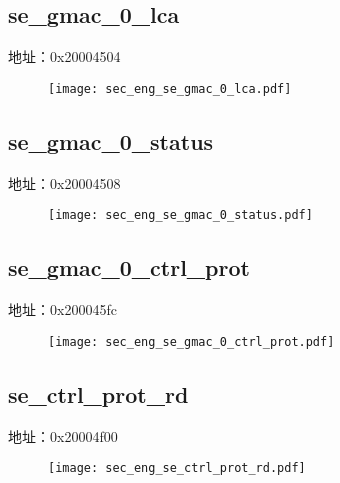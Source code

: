 \subsection{se\_gmac\_0\_lca}
\label{sec_eng-se-gmac-0-lca}
地址：0x20004504
 \begin{figure}[H]
\texttt{[image: sec\_eng\_se\_gmac\_0\_lca.pdf]}
\end{figure}

\subsection{se\_gmac\_0\_status}
\label{sec_eng-se-gmac-0-status}
地址：0x20004508
 \begin{figure}[H]
\texttt{[image: sec\_eng\_se\_gmac\_0\_status.pdf]}
\end{figure}

\subsection{se\_gmac\_0\_ctrl\_prot}
\label{sec_eng-se-gmac-0-ctrl-prot}
地址：0x200045fc
 \begin{figure}[H]
\texttt{[image: sec\_eng\_se\_gmac\_0\_ctrl\_prot.pdf]}
\end{figure}

\subsection{se\_ctrl\_prot\_rd}
\label{sec_eng-se-ctrl-prot-rd}
地址：0x20004f00
 \begin{figure}[H]
\texttt{[image: sec\_eng\_se\_ctrl\_prot\_rd.pdf]}
\end{figure}

